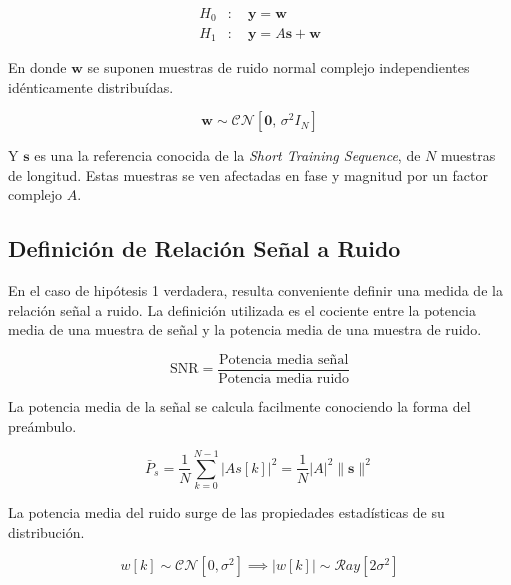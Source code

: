 \begin{equation}\label{eq:def_hip}
    \begin{aligned}
        H_0&: \quad \mathbf{y} = \mathbf{w}\\
        H_1&: \quad \mathbf{y} = A\mathbf{s} + \mathbf{w}
    \end{aligned}
\end{equation}

En donde $\mathbf{w}$ se suponen muestras de ruido normal complejo independientes idénticamente distribuídas. 

\begin{equation}
	\mathbf{w} \sim \mathcal{CN}\left[\mathbf{0},\, \sigma^2 I_N\right]
\end{equation}

Y $\mathbf{s}$ es una la referencia conocida de la \textit{Short Training Sequence}, de $N$ muestras de longitud. Estas muestras se ven afectadas en fase y magnitud por un factor complejo $A$.	

\subsection{Definición de Relación Señal a Ruido}
\label{Ss:def_snr}

En el caso de hipótesis 1 verdadera, resulta conveniente definir una medida de la relación señal a ruido. La definición utilizada es el cociente entre la potencia media de una muestra de señal y la potencia media de una muestra de ruido.

\begin{equation}
\text{SNR} = \frac{\text{Potencia media señal}}{\text{Potencia media ruido}}
\end{equation}

La potencia media de la señal se calcula facilmente conociendo la forma del preámbulo. 

\begin{equation}
\bar{P}_s = \frac{1}{N}\sum_{k=0}^{N-1}\lvert A s[k] \rvert^2 = \frac{1}{N} \lvert A \rvert^2 \lVert \mathbf{s} \rVert^2
\end{equation}

La potencia media del ruido surge de las propiedades estadísticas de su distribución.

\begin{equation}
w[k] \sim \mathcal{CN}\left[0, \sigma^2\right]  \implies|w[k]| \sim \mathcal{R}ay\left[2\sigma^2\right]
\end{equation}


